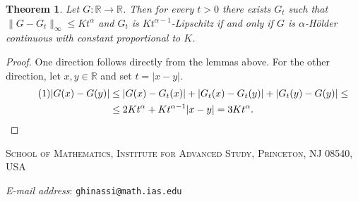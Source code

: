 \documentclass[11pt, twoside, leqno]{article}
\numberwithin{equation}{section}
\newcommand\numberthis{\addtocounter{equation}{1}\tag{\theequation}}
\theoremstyle{plain}
\newtheorem{thm}{Theorem}[section]
\theoremstyle{definition}
\newcommand{\R}{\mathbb{R}}
\newcommand{\e}{\varepsilon} %
\begin{document}
\begin{thm}
Let $G \colon \R \to \R$. Then for every $t>0$ there exists $G_t$ such that $\|G-G_t\|_{\infty} \leq Kt^{\alpha}$ and $G_t$ is $Kt^{\alpha-1}$-Lipschitz if and only if $G$ is $\alpha$-H\"older continuous with constant proportional to $K$.
\end{thm}
\begin{proof}
One direction follows directly from the lemmas above. For the other direction, let $x,y \in \R$ and set $t=|x-y|$.
\begin{align*} \numberthis
|G(x)-G(y)| & \leq | G(x)-G_t(x)| + |G_t(x)-G_t(y)| + |G_t(y)-G(y)| \leq \\
& \leq 2Kt^{\alpha} + K t^{\alpha-1}|x-y|=3Kt^{\alpha}. \qedhere
\end{align*}
\end{proof}



%




\setlength{\bibsep}{0pt plus 0.3ex}


\vspace{2cm}
\textsc{School of Mathematics, Institute for Advanced Study, Princeton, NJ 08540, USA}


\emph{E-mail address}: \texttt{ghinassi@math.ias.edu}
\end{document}
